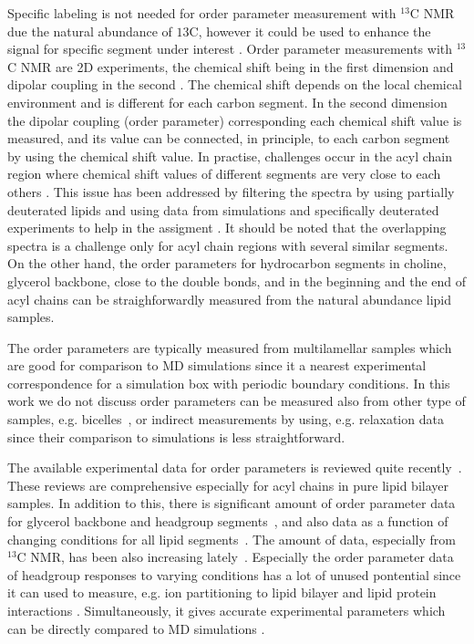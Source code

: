 \documentclass[aps,prl,superscriptaddress,twocolumn]{revtex4}
\begin{document}
Specific labeling is not needed for order parameter measurement with $^{13}$C NMR due the 
natural abundance of $ {13}$C, however it could be used to enhance the signal for specific 
segment under interest \cite{??}. Order parameter measurements with $^{13}$C NMR are
2D experiments, the chemical shift being in the first dimension and dipolar coupling 
in the second \cite{??}. The chemical shift depends on the local chemical environment and 
is different for each carbon segment. In the second dimension the dipolar coupling
(order parameter) corresponding each chemical shift value is measured, and its value 
can be connected, in principle, to each carbon segment by using the chemical shift value.  
In practise, challenges occur in the acyl chain region where chemical shift values 
of different segments are very close to each others \cite{hong95a,gross97,dvinskikh05a,ferreira13,leftin14}. This issue has been
addressed by filtering the spectra by using partially deuterated lipids \cite{ferreira13}
and using data from simulations and specifically deuterated experiments to help in 
the assigment \cite{ferreira13,leftin14}. It should be noted that the overlapping spectra 
is a challenge only for acyl chain regions with several similar segments. On the other hand, 
the order parameters for hydrocarbon segments in choline, glycerol backbone, close to the 
double bonds, and in the beginning and the end of acyl chains can be straighforwardly 
measured from the natural abundance lipid samples. 

The order parameters are typically measured from multilamellar samples which are good for comparison to MD 
simulations since it a nearest experimental correspondence for a simulation box with periodic boundary conditions. 
In this work we do not discuss order parameters can be measured also from other type of samples, 
e.g. bicelles~\cite{aussenac03,raffard00,sanders92}, or indirect measurements by using, e.g. relaxation
data~\cite{marbella15} since their comparison to simulations is less straightforward.  

The available experimental data for order parameters is reviewed
quite recently~\cite{leftin11,marsh13}. These reviews are comprehensive especially for 
acyl chains in pure lipid bilayer samples. In addition to this, there is significant
amount of order parameter data for glycerol backbone and headgroup segments~\cite{botan15}, and
also data as a function of changing conditions for all lipid segments~\cite{akutsu81,dvinskikh05a,mallikarjunaiah11,ferreira13,??}.
The amount of data, especially from $^{13}$C NMR, has been also increasing lately~\cite{ferreira13,leftin13,leftin14}.
Especially the order parameter data of headgroup responses to varying conditions 
has a lot of unused pontential since it can used to measure, e.g. ion partitioning to lipid
bilayer \cite{akutsu81,??,ionpaper} and lipid protein interactions \cite{roux89,kuchinka89,leftin13}. Simultaneously, it
gives accurate experimental parameters which can be directly compared to MD simulations \cite{botan15,ionpaper}.
\end{document}
